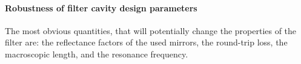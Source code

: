 \paragraph{Robustness of filter cavity design parameters}
The most obvious quantities, that will potentially  change the properties of the filter are: the reflectance factors of the used mirrors, the round-trip loss, the macroscopic length, and the resonance frequency.

